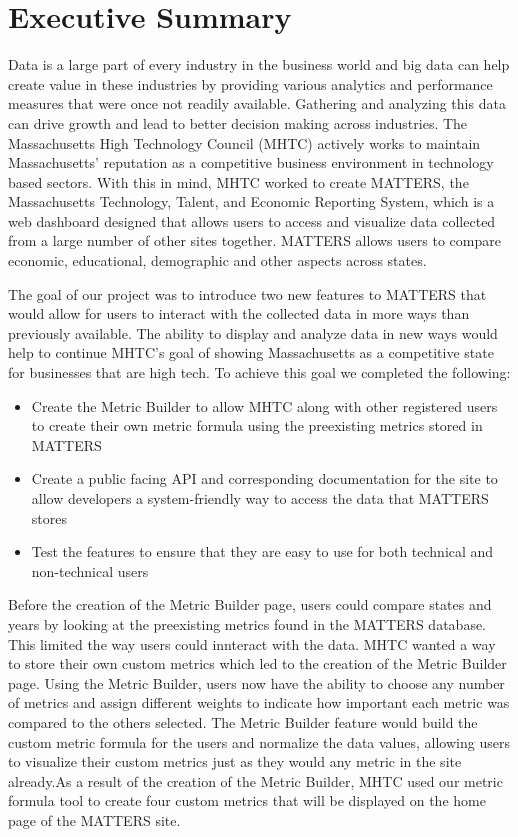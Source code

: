 \chapter*{Executive Summary}
	
 Data is a large part of every industry in the business world and big data can help create value in these industries by providing various analytics and performance measures that were once not readily available. Gathering and analyzing this data can drive growth and lead to better decision making across industries. The Massachusetts High Technology Council (MHTC) actively works to maintain Massachusetts' reputation as a competitive business environment in technology based sectors. With this in mind, MHTC worked to create MATTERS, the Massachusetts Technology, Talent, and Economic Reporting System, which is a web dashboard designed that allows users to access and visualize data collected from a large number of other sites together. MATTERS allows users to compare economic, educational, demographic and other aspects across states.
 
 The goal of our project was to introduce two new features to MATTERS that would allow for users to interact with the collected data in more ways than previously available. The ability to display and analyze data in new ways would help to continue MHTC's goal of showing Massachusetts as a competitive state for businesses that are high tech. To achieve this goal we completed the following:
 \begin{itemize}
 	\item Create the Metric Builder to allow MHTC along with other registered users to create their own metric formula using the preexisting metrics stored in MATTERS
 	
 	\item Create a public facing API and corresponding documentation for the site to allow developers a system-friendly way to access the data that MATTERS stores
 	
 	\item Test the features to ensure that they are easy to use for both technical and non-technical users
 \end{itemize} 
 
 Before the creation of the Metric Builder page, users could compare states and years by looking at the preexisting metrics found in the MATTERS database. This limited the way users could innteract with the data. MHTC wanted a way to store their own custom metrics which led to the creation of the Metric Builder page. Using the Metric Builder, users now have the ability to choose any number of metrics and assign different weights to indicate how important each metric was compared to the others selected. The Metric Builder feature would build the custom metric formula for the users and normalize the data values, allowing users to visualize their custom metrics just as they would any metric in the site already.As a result of the creation of the Metric Builder, MHTC used our metric formula tool to create four custom metrics that will be displayed on the home page of the MATTERS site.
 
